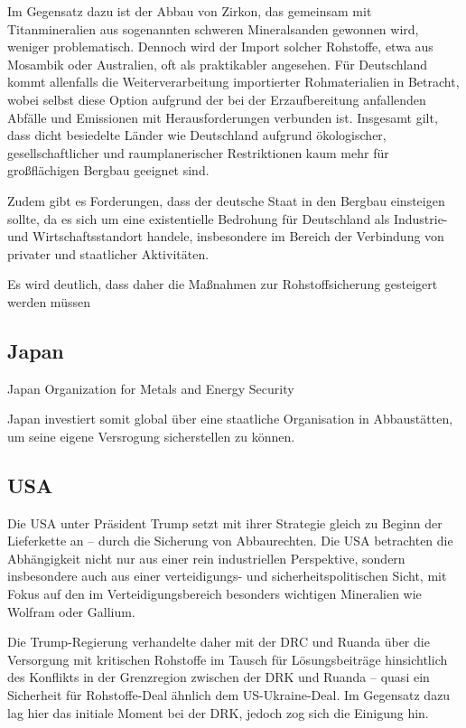 \documentclass[12pt,a4paper,oneside]{book} %
\begin{document}
Im Gegensatz dazu ist der Abbau von Zirkon, das gemeinsam mit Titanmineralien aus sogenannten schweren Mineralsanden gewonnen wird, weniger problematisch. Dennoch wird der Import solcher Rohstoffe, etwa aus Mosambik oder Australien, oft als praktikabler angesehen. Für Deutschland kommt allenfalls die Weiterverarbeitung importierter Rohmaterialien in Betracht, wobei selbst diese Option aufgrund der bei der Erzaufbereitung anfallenden Abfälle und Emissionen mit Herausforderungen verbunden ist. Insgesamt gilt, dass dicht besiedelte Länder wie Deutschland aufgrund ökologischer, gesellschaftlicher und raumplanerischer Restriktionen kaum mehr für großflächigen Bergbau geeignet sind.

Zudem gibt es Forderungen, dass der deutsche Staat in den Bergbau einsteigen sollte, da es sich um eine existentielle Bedrohung für Deutschland als Industrie- und Wirtschaftsstandort handele, insbesondere im Bereich der Verbindung von privater und staatlicher Aktivitäten.\autocite{https://www.africa-business-guide.de/de/praxis/erfahrungen/schluesselrolle-afrikas-bedeutung-bei-den-kritischen-rohstoffen--1920084}

Es wird deutlich, dass daher die Maßnahmen zur Rohstoffsicherung gesteigert werden müssen


\subsection{Japan}

Japan Organization for Metals and Energy Security

Japan investiert somit global über eine staatliche Organisation in Abbaustätten, um seine eigene Versrogung sicherstellen zu können.


\subsection{USA}
Die USA unter Präsident Trump setzt mit ihrer Strategie gleich zu Beginn der Lieferkette an -- durch die Sicherung von Abbaurechten. Die USA betrachten die Abhängigkeit nicht nur aus einer rein industriellen Perspektive, sondern insbesondere auch aus einer verteidigungs- und sicherheitspolitischen Sicht, mit Fokus auf den im Verteidigungsbereich besonders wichtigen Mineralien wie Wolfram oder Gallium.

Die Trump-Regierung verhandelte daher mit der DRC und Ruanda über die Versorgung mit kritischen Rohstoffe im Tausch für Lösungsbeiträge hinsichtlich des Konflikts in der Grenzregion zwischen der DRK und Ruanda -- quasi ein \glqq Sicherheit für Rohstoffe\grqq-Deal ähnlich dem US-Ukraine-Deal. Im Gegensatz dazu lag hier das initiale Moment bei der DRK, jedoch zog sich die Einigung hin.
\end{document}
